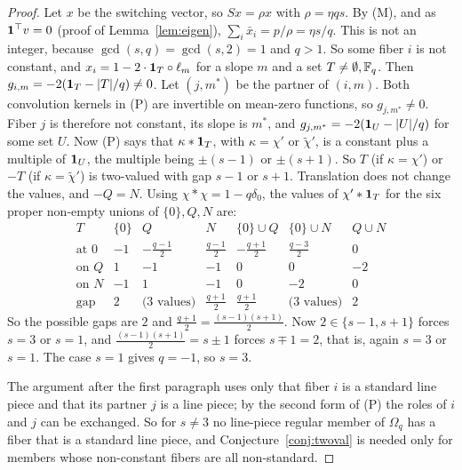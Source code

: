 \begin{proof}
Let $x$ be the switching vector, so $Sx=\rho x$ with $\rho=\eta qs$.
By (M), and as $\mathbf 1^\top v=0$ (proof of Lemma~\ref{lem:eigen}), $\sum_i\bar x_i=p/\rho=\eta s/q$.
This is not an integer, because $\gcd(s,q)=\gcd(s,2)=1$ and $q>1$.
So some fiber $i$ is not constant, and $x_i=1-2\cdot\mathbf 1_T\circ\ell_m$ for a slope $m$ and a set $T\ne\emptyset,\mathbb{F}_q$.
Then $g_{i,m}=-2(\mathbf 1_T-|T|/q)\ne0$.
Let $(j,m^*)$ be the partner of $(i,m)$.
Both convolution kernels in (P) are invertible on mean-zero functions, so $g_{j,m^*}\ne0$.
Fiber $j$ is therefore not constant, its slope is $m^*$, and $g_{j,m^*}=-2(\mathbf 1_U-|U|/q)$ for some set $U$.
Now (P) says that $\kappa*\mathbf 1_T$, with $\kappa=\chi'$ or $\tilde\chi'$, is a constant plus a multiple of
$\mathbf 1_U$, the multiple being $\pm(s-1)$ or $\pm(s+1)$. So $T$ (if $\kappa=\chi'$) or $-T$ (if $\kappa=\tilde\chi'$)
is two-valued with gap $s-1$ or $s+1$. Translation does not change the values, and $-Q=N$. Using
$\chi*\chi=1-q\delta_0$, the values of $\chi'*\mathbf 1_T$ for the six proper non-empty unions of $\{0\},Q,N$ are:
\[
\begin{array}{l|cccccc}
T&\{0\}&Q&N&\{0\}\cup Q&\{0\}\cup N&Q\cup N\\\hline
\text{at }0&-1&-\tfrac{q-1}2&\tfrac{q-1}2&-\tfrac{q+1}2&\tfrac{q-3}2&0\\
\text{on }Q&1&-1&-1&0&0&-2\\
\text{on }N&-1&1&-1&0&-2&0\\\hline
\text{gap}&2&\text{(3 values)}&\tfrac{q+1}2&\tfrac{q+1}2&\text{(3 values)}&2
\end{array}
\]
So the possible gaps are $2$ and $\tfrac{q+1}2=\tfrac{(s-1)(s+1)}2$.
Now $2\in\{s-1,s+1\}$ forces $s=3$ or $s=1$, and $\tfrac{(s-1)(s+1)}2=s\pm1$ forces $s\mp1=2$, that is, again $s=3$ or $s=1$. The case $s=1$ gives $q=-1$, so $s=3$.

The argument after the first paragraph uses only that fiber $i$ is a standard line piece and that its partner $j$ is a
line piece; by the second form of (P) the roles of $i$ and $j$ can be exchanged. So for $s\ne3$ no line-piece regular
member of $\Omega_q$ has a fiber that is a standard line piece, and Conjecture~\ref{conj:twoval} is needed only for
members whose non-constant fibers are all non-standard.
\end{proof}

